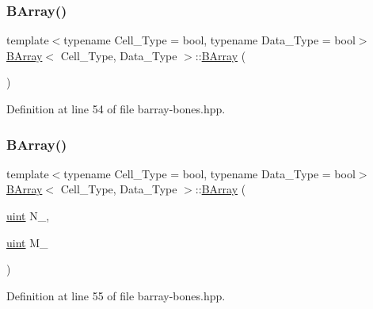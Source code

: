 \subsubsection{\texorpdfstring{B\+Array()}{BArray()}\hspace{0.1cm}{\footnotesize\ttfamily [1/5]}}
{\footnotesize\ttfamily template$<$typename Cell\+\_\+\+Type = bool, typename Data\+\_\+\+Type = bool$>$ \\
\hyperlink{class_b_array}{B\+Array}$<$ Cell\+\_\+\+Type, Data\+\_\+\+Type $>$\+::\hyperlink{class_b_array}{B\+Array} (\begin{DoxyParamCaption}{ }\end{DoxyParamCaption})\hspace{0.3cm}{\ttfamily [inline]}}



Definition at line 54 of file barray-\/bones.\+hpp.

\mbox{\label{class_b_array_a411b65e1985396261ca9df2923a6f3c6}} 
\subsubsection{\texorpdfstring{B\+Array()}{BArray()}\hspace{0.1cm}{\footnotesize\ttfamily [2/5]}}
{\footnotesize\ttfamily template$<$typename Cell\+\_\+\+Type = bool, typename Data\+\_\+\+Type = bool$>$ \\
\hyperlink{class_b_array}{B\+Array}$<$ Cell\+\_\+\+Type, Data\+\_\+\+Type $>$\+::\hyperlink{class_b_array}{B\+Array} (\begin{DoxyParamCaption}\item[{\hyperlink{typedefs_8hpp_a91ad9478d81a7aaf2593e8d9c3d06a14}{uint}}]{N\+\_\+,  }\item[{\hyperlink{typedefs_8hpp_a91ad9478d81a7aaf2593e8d9c3d06a14}{uint}}]{M\+\_\+ }\end{DoxyParamCaption})\hspace{0.3cm}{\ttfamily [inline]}}



Definition at line 55 of file barray-\/bones.\+hpp.

\mbox{\label{class_b_array_a098b6170a1ea4b2a8e0832d1163e9ed1}} 
